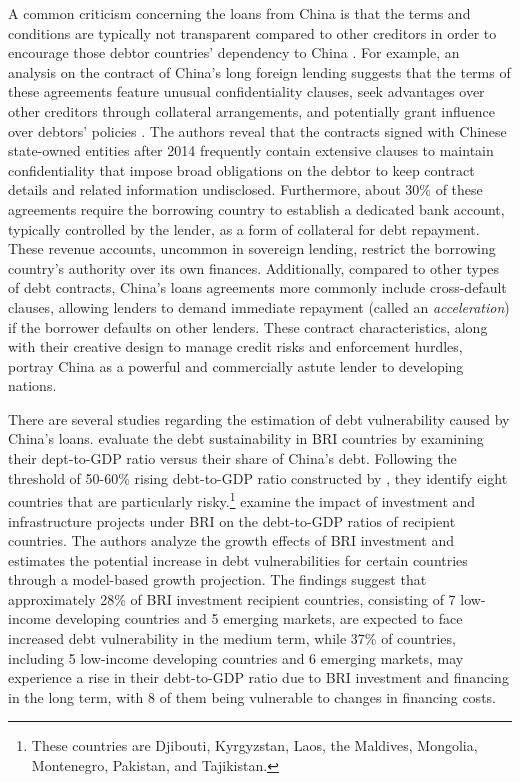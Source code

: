 A common criticism concerning the loans from China is that the terms and conditions are typically not transparent compared to other creditors in order to encourage those debtor countries' dependency to China \citep{tillerson2018us}. For example,
an analysis on the contract of China's long foreign lending suggests that the terms of these agreements feature unusual confidentiality clauses, seek advantages over other creditors through collateral arrangements, and potentially grant influence over debtors' policies \citep{Gelpern-22}.
The authors reveal that the contracts signed with Chinese state-owned entities after 2014 frequently contain extensive clauses to maintain confidentiality that impose broad obligations on the debtor to keep contract details and related information undisclosed. Furthermore, about 30\% of these agreements require the borrowing country to establish a dedicated bank account, typically controlled by the lender, as a form of collateral for debt repayment. These revenue accounts, uncommon in sovereign lending, restrict the borrowing country's authority over its own finances. Additionally, compared to other types of debt contracts, China's loans agreements more commonly include cross-default clauses, allowing lenders to demand immediate repayment (called an \emph{acceleration}) if the borrower defaults on other lenders.
These contract characteristics, along with their creative design to manage credit risks and enforcement hurdles, portray China as a powerful and commercially astute lender to developing nations.

There are several studies regarding the estimation of debt vulnerability caused by China's loans. \citet*{Hurley19-8-debt-trap} evaluate the debt sustainability in BRI countries by examining their dept-to-GDP ratio versus their share of China's debt. Following the threshold of 50-60\% rising debt-to-GDP ratio constructed by \citet{Chudik-15}, they identify eight
countries that are particularly risky.\footnote{
    These countries are Djibouti, Kyrgyzstan, Laos, the Maldives, Mongolia, Montenegro, Pakistan, and Tajikistan.}
\citet*{Bandiera-Vasileios-BRI-debt} examine the impact of investment and infrastructure projects under BRI on the debt-to-GDP ratios of recipient countries. The authors analyze the growth effects of BRI investment and estimates the potential increase in debt vulnerabilities for certain countries through a model-based growth projection. The findings suggest that approximately 28\% of BRI investment recipient countries, consisting of 7 low-income developing countries and 5 emerging markets, are expected to face increased debt vulnerability in the medium term, while 37\% of countries, including 5 low-income developing countries and 6 emerging markets, may experience a rise in their debt-to-GDP ratio due to BRI investment and financing in the long term, with 8 of them being vulnerable to changes in financing costs.


